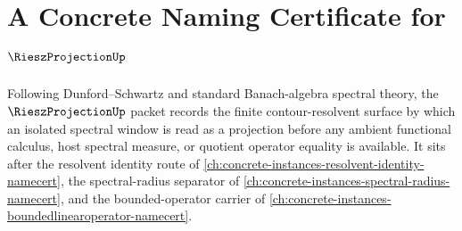 \chapter{A Concrete Naming Certificate for $\RieszProjectionUp$}
\label{ch:concrete-instances-riesz-projection-namecert}

Following Dunford--Schwartz and standard Banach-algebra spectral theory, the $\RieszProjectionUp$ packet records the finite contour-resolvent surface by which an isolated spectral window is read as a projection before any ambient functional calculus, host spectral measure, or quotient operator equality is available. It sits after the resolvent identity route of \autoref{ch:concrete-instances-resolvent-identity-namecert}, the spectral-radius separator of \autoref{ch:concrete-instances-spectral-radius-namecert}, and the bounded-operator carrier of \autoref{ch:concrete-instances-boundedlinearoperator-namecert}.

